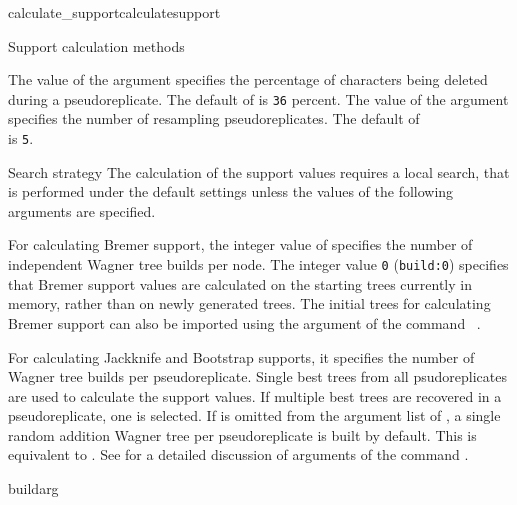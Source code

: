 \begin{command}{calculate\_support}{calculatesupport}
\begin{arguments}
\begin{argumentgroup}{Support calculation methods}
                \begin{description}
                        {The value of the argument  specifies the
                        percentage of characters being deleted during a pseudoreplicate. The
                        default of  is \texttt{36} percent.}
                        {}
                        {The value of the argument  specifies the
                        number of resampling pseudoreplicates. The default of \\
                         is \texttt{5}.}
                        {}
               \end{description}  
		\end{argumentgroup}

        \begin{argumentgroup}{Search strategy}
            {The calculation of the support values requires a local search,
            that is performed under the default settings unless the values
            of the following arguments are specified.}
		 
             {For calculating Bremer support, the integer value of
              specifies the number of independent
             Wagner tree builds per node. The integer value \texttt{0}
             (\texttt{build:0}) specifies that Bremer support values are
             calculated on the starting trees currently
             in memory, rather than on newly generated trees.
             The initial trees for calculating Bremer support
             can also be imported using the argument 
             of the command ~.
             
             For calculating Jackknife
             and Bootstrap supports, it specifies the number of
             Wagner tree builds per pseudoreplicate.  Single best trees from all
             psudoreplicates are used to calculate the support values. If
             multiple best trees are recovered in a pseudoreplicate, one 
             is selected. If  is
             omitted from the argument list of ,
             a single random addition Wagner tree per
             pseudoreplicate is built by default. This is equivalent to 
             . See
              for a detailed discussion of
             arguments of the command .}
             {buildarg}


\end{argumentgroup}
\end{arguments}
\end{command}
